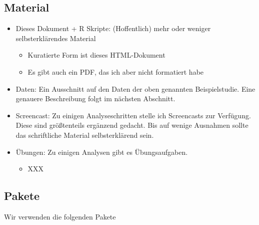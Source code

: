 \documentclass[
]{book}
\providecommand{\tightlist}{%
  \setlength{\itemsep}{0pt}\setlength{\parskip}{0pt}}
\begin{document}
\hypertarget{material}{%
\subsection*{Material}\label{material}}

\begin{itemize}
\item
  Dieses Dokument + R Skripte: (Hoffentlich) mehr oder weniger selbsterklärendes Material

  \begin{itemize}
  \tightlist
  \item
    Kuratierte Form ist dieses HTML-Dokument
  \item
    Es gibt auch ein PDF, das ich aber nicht formatiert habe
  \end{itemize}
\item
  Daten: Ein Ausschnitt auf den Daten der oben genannten Beispielstudie. Eine genauere Beschreibung folgt im nächsten Abschnitt.
\item
  Screencast: Zu einigen Analyseschritten stelle ich Screencasts zur Verfügung. Diese sind größtenteils ergänzend gedacht. Bis auf wenige Ausnahmen sollte das schriftliche Material selbsterklärend sein.
\item
  Übungen: Zu einigen Analysen gibt es Übungsaufgaben.

  \begin{itemize}
  \tightlist
  \item
    XXX
  \end{itemize}
\end{itemize}

\hypertarget{pakete}{%
\subsection*{Pakete}\label{pakete}}

Wir verwenden die folgenden Pakete
\end{document}
